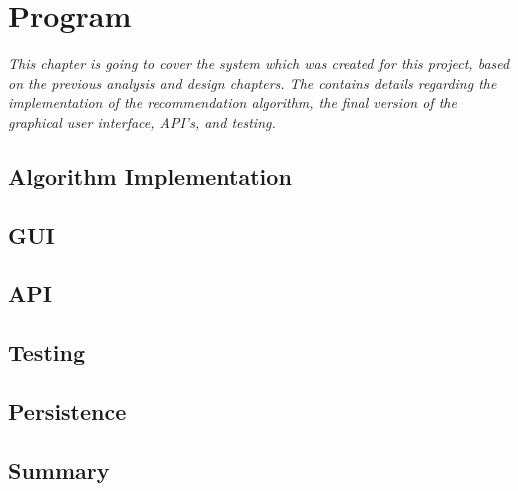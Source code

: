 \chapter{Program}

\textit{This chapter is going to cover the system which was created for this project, based on the previous analysis and design chapters. The contains details regarding the implementation of the recommendation algorithm, the final version of the graphical user interface, API's, and testing.}

\section{Algorithm Implementation}
\label{AlgorithmProg}

\section{GUI}
\label{GUI}

\section{API}
\label{API}

\section{Testing}
\label{Testing}

\section{Persistence}
\label{Persistence}

\section{Summary}
\label{ProSummary}